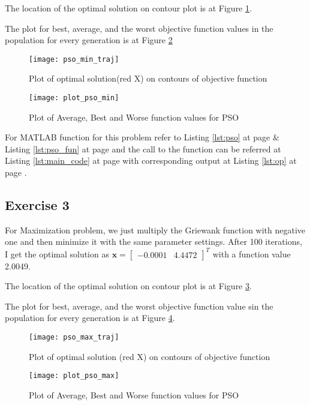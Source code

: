\documentclass[11pt]{article}
\newcommand{\V}[1]{\pmb{#1}}
\newcommand{\mat}[1]{\begin{bmatrix}#1\end{bmatrix}}
\newcommand{\reflst}[1]{Listing \ref{#1} at page \pageref{#1}}
\newcommand{\reffig}[1]{Figure \ref{#1}}
\begin{document}
\noindent The location of the optimal solution on contour plot is at \reffig{fig:pso_min_cont}.

\noindent The plot for best, average, and the worst objective function values in the population for every generation is at \reffig{fig:pso_min}

\begin{figure}[!h]
 \centering
 \texttt{[image: pso\_min\_traj]}
 \caption{Plot of optimal solution(red X) on contours of objective function}
 \label{fig:pso_min_cont}
\end{figure}

\begin{figure}[!h]
 \centering
 \texttt{[image: plot\_pso\_min]}
 \caption{Plot of Average, Best and Worse function values for PSO}
 \label{fig:pso_min}
\end{figure}

\noindent For MATLAB function for this problem refer to \reflst{lst:pso} \& \reflst{lst:pso_fun} and the call to the function can be referred at \reflst{lst:main_code} with corresponding output at \reflst{lst:op}.
%
\clearpage
\vspace{2ex}
%
\subsection*{Exercise 3}
For Maximization problem, we just multiply the Griewank function with negative one and then minimize it with the same parameter settings. After 100 iterations, I get the optimal solution as $\V{x}=\mat{   -0.0001 &    4.4472}^T$ with a function value 2.0049. 

\noindent The location of the optimal solution on contour plot is at \reffig{fig:pso_max_cont}.

\noindent The plot for best, average, and the worst objective function value sin the population for every generation is at \reffig{fig:pso_max}.

\begin{figure}[!h]
 \centering
 \texttt{[image: pso\_max\_traj]}
 \caption{Plot of optimal solution (red X) on contours of objective function}
 \label{fig:pso_max_cont}
\end{figure}

\begin{figure}[!h]
 \centering
 \texttt{[image: plot\_pso\_max]}
 \caption{Plot of Average, Best and Worse function values for PSO}
 \label{fig:pso_max}
\end{figure}
\end{document}
